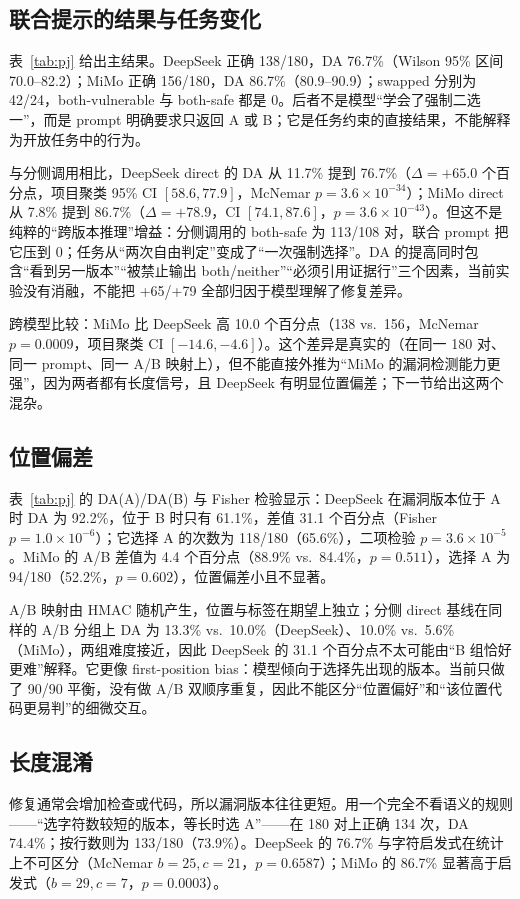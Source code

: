 \documentclass[conference]{IEEEtran}
\begin{document}


\subsection{联合提示的结果与任务变化}
表~\ref{tab:pj} 给出主结果。DeepSeek 正确 138/180，DA 76.7\%（Wilson 95\% 区间 70.0--82.2）；MiMo 正确 156/180，DA 86.7\%（80.9--90.9）；swapped 分别为 42/24，both-vulnerable 与 both-safe 都是 0。后者不是模型“学会了强制二选一”，而是 prompt 明确要求只返回 A 或 B；它是任务约束的直接结果，不能解释为开放任务中的行为。

与分侧调用相比，DeepSeek direct 的 DA 从 11.7\% 提到 76.7\%（$\Delta=+65.0$ 个百分点，项目聚类 95\% CI $[58.6,77.9]$，McNemar $p=3.6\times10^{-34}$）；MiMo direct 从 7.8\% 提到 86.7\%（$\Delta=+78.9$，CI $[74.1,87.6]$，$p=3.6\times10^{-43}$）。但这不是纯粹的“跨版本推理”增益：分侧调用的 both-safe 为 113/108 对，联合 prompt 把它压到 0；任务从“两次自由判定”变成了“一次强制选择”。DA 的提高同时包含“看到另一版本”“被禁止输出 both/neither”“必须引用证据行”三个因素，当前实验没有消融，不能把 +65/+79 全部归因于模型理解了修复差异。

跨模型比较：MiMo 比 DeepSeek 高 10.0 个百分点（138 vs.\ 156，McNemar $p=0.0009$，项目聚类 CI $[-14.6,-4.6]$）。这个差异是真实的（在同一 180 对、同一 prompt、同一 A/B 映射上），但不能直接外推为“MiMo 的漏洞检测能力更强”，因为两者都有长度信号，且 DeepSeek 有明显位置偏差；下一节给出这两个混杂。

\subsection{位置偏差}
表~\ref{tab:pj} 的 DA(A)/DA(B) 与 Fisher 检验显示：DeepSeek 在漏洞版本位于 A 时 DA 为 92.2\%，位于 B 时只有 61.1\%，差值 31.1 个百分点（Fisher $p=1.0\times10^{-6}$）；它选择 A 的次数为 118/180（65.6\%），二项检验 $p=3.6\times10^{-5}$。MiMo 的 A/B 差值为 4.4 个百分点（88.9\% vs.\ 84.4\%，$p=0.511$），选择 A 为 94/180（52.2\%，$p=0.602$），位置偏差小且不显著。

A/B 映射由 HMAC 随机产生，位置与标签在期望上独立；分侧 direct 基线在同样的 A/B 分组上 DA 为 13.3\% vs.\ 10.0\%（DeepSeek）、10.0\% vs.\ 5.6\%（MiMo），两组难度接近，因此 DeepSeek 的 31.1 个百分点不太可能由“B 组恰好更难”解释。它更像 first-position bias：模型倾向于选择先出现的版本。当前只做了 90/90 平衡，没有做 A/B 双顺序重复，因此不能区分“位置偏好”和“该位置代码更易判”的细微交互。

\subsection{长度混淆}
修复通常会增加检查或代码，所以漏洞版本往往更短。用一个完全不看语义的规则——“选字符数较短的版本，等长时选 A”——在 180 对上正确 134 次，DA 74.4\%；按行数则为 133/180（73.9\%）。DeepSeek 的 76.7\% 与字符启发式在统计上不可区分（McNemar $b=25,c=21$，$p=0.6587$）；MiMo 的 86.7\% 显著高于启发式（$b=29,c=7$，$p=0.0003$）。
\end{document}

